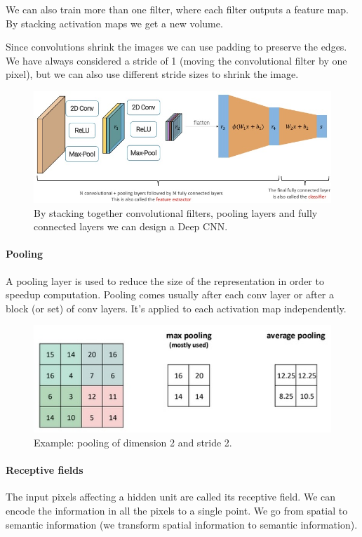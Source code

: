 We can also train more than one filter, where each filter outputs a feature map.
By stacking activation maps we get a new volume.

Since convolutions shrink the images we can use padding to preserve the edges.
We have always considered a stride of 1 (moving the convolutional filter by one pixel), but we can also use different stride sizes to shrink the image.

\begin{figure}[htbp]
  \centering
  \includegraphics[width=0.8\linewidth]{./img/deep_cnn.jpg}
  \caption{By stacking together convolutional filters, pooling layers and fully connected layers we can design a Deep CNN.}
\end{figure}

\paragraph{Pooling}
A pooling layer is used to reduce the size of the representation in order to speedup computation.
Pooling comes usually after each conv layer or after a block (or set) of conv layers.
It's applied to each activation map independently.

\begin{figure}[htbp]
  \centering
  \includegraphics[width=0.6\linewidth]{./img/pooling.jpg}
  \caption{Example: pooling of dimension 2 and stride 2.}
\end{figure}

\paragraph{Receptive fields}
The input pixels affecting a hidden unit are called its receptive field.
We can encode the information in all the pixels to a single point.
We go from spatial to semantic information (we transform spatial information to semantic information).

